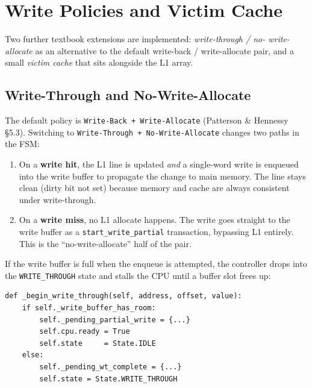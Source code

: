 \documentclass[11pt,a4paper]{article}
\begin{document}
\section{Write Policies and Victim Cache}\label{sec:policies}

Two further textbook extensions are implemented: \emph{write-through / no-
write-allocate} as an alternative to the default write-back / write-allocate
pair, and a small \emph{victim cache} that sits alongside the L1 array.

\subsection{Write-Through and No-Write-Allocate}

The default policy is \texttt{Write-Back + Write-Allocate} (Patterson \&
Hennessy \S5.3). Switching to \texttt{Write-Through + No-Write-Allocate}
changes two paths in the FSM:

\begin{enumerate}[leftmargin=1.4em,itemsep=0.1em]
    \item On a \textbf{write hit}, the L1 line is updated \emph{and} a
    single-word write is enqueued into the write buffer to propagate the
    change to main memory. The line stays clean (dirty bit not set) because
    memory and cache are always consistent under write-through.
    \item On a \textbf{write miss}, no L1 allocate happens. The write goes
    straight to the write buffer as a \texttt{start\_write\_partial}
    transaction, bypassing L1 entirely. This is the ``no-write-allocate''
    half of the pair.
\end{enumerate}

If the write buffer is full when the enqueue is attempted, the controller
drops into the \texttt{WRITE\_THROUGH} state and stalls the CPU until a
buffer slot frees up:

\begin{lstlisting}
def _begin_write_through(self, address, offset, value):
    if self._write_buffer_has_room:
        self._pending_partial_write = {...}
        self.cpu.ready = True
        self.state     = State.IDLE
    else:
        self._pending_wt_complete = {...}
        self.state = State.WRITE_THROUGH
\end{lstlisting}
\end{document}
